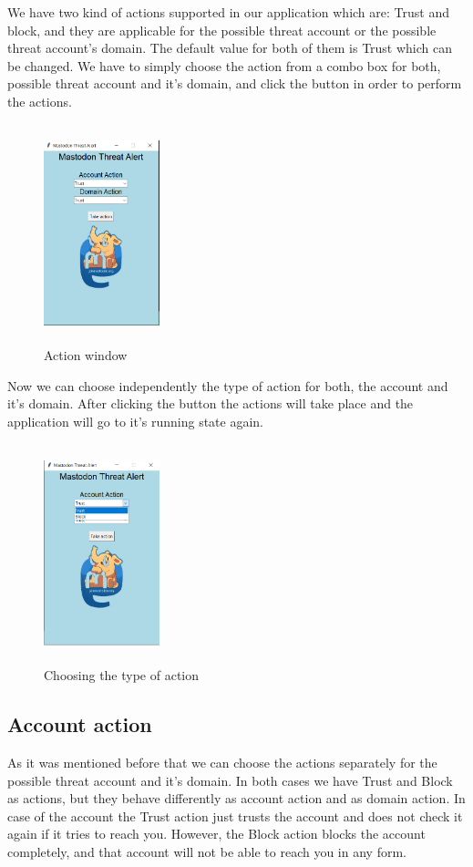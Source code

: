 We have two kind of actions supported in our application which are: Trust and block,
and they are applicable for the possible threat account or the possible threat account's
domain. The default value for both of them is Trust which can be changed.
\newline
We have to simply choose the action from a combo box for both, possible threat account and
it's domain, and click the button in order to perform the actions. 
\begin{figure}[H]
	\centering
	\includegraphics[width=0.3\textwidth,height=240px]{images/actionspage.png}
	\caption{Action window}
	\label{fig:action_page}
\end{figure}
Now we can choose independently the type of action for both, the account
and it's domain.
\newline
After clicking the button the actions will take place
and the application will go to it's running state again.
\begin{figure}[H]
	\centering
 	\includegraphics[width=0.3\textwidth,height=240px]{images/actiontypes.png}
	\caption{Choosing the type of action}
	\label{fig:choosing_action}
\end{figure}

\subsection{Account action}
\label{ss:acc_action}
As it was mentioned before that we can choose the actions separately for the possible threat account and it's
domain. In both cases we have Trust and Block as actions, but they behave differently
as account action and as domain action.
\newline
In case of the account the Trust action just trusts the account and does not check it
again if it tries to reach you. However, the Block action blocks the account completely,
and that account will not be able to reach you in any form.
